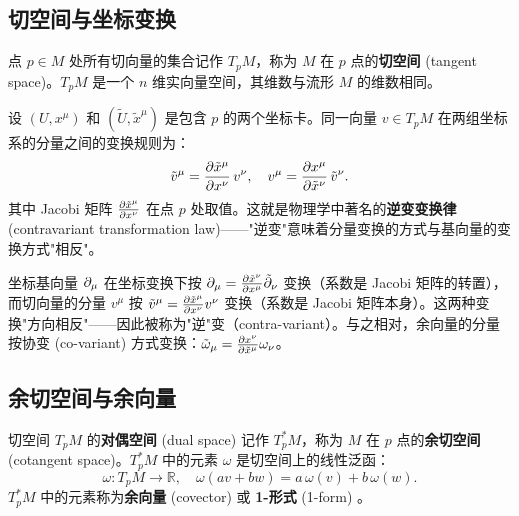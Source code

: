 \subsection{切空间与坐标变换}

\begin{definition}[切空间]
点 $p \in M$ 处所有切向量的集合记作 $T_pM$，称为 $M$ 在 $p$ 点的\textbf{切空间} (tangent space)。$T_pM$ 是一个 $n$ 维实向量空间，其维数与流形 $M$ 的维数相同。
\end{definition}

\begin{property}[切向量的坐标变换]
设 $(U, x^\mu)$ 和 $(\tilde{U}, \tilde{x}^\mu)$ 是包含 $p$ 的两个坐标卡。同一向量 $v \in T_pM$ 在两组坐标系的分量之间的变换规则为：
\begin{equation}
    \tilde{v}^\mu = \frac{\partial \tilde{x}^\mu}{\partial x^\nu} \, v^\nu, \quad v^\mu = \frac{\partial x^\mu}{\partial \tilde{x}^\nu} \, \tilde{v}^\nu.
\end{equation}
其中 Jacobi 矩阵 $\frac{\partial \tilde{x}^\mu}{\partial x^\nu}$ 在点 $p$ 处取值。这就是物理学中著名的\textbf{逆变变换律} (contravariant transformation law)——"逆变"意味着分量变换的方式与基向量的变换方式"相反"。
\end{property}

\begin{remark}[为什么称为"逆变"？]
坐标基向量 $\partial_\mu$ 在坐标变换下按 $\partial_\mu = \frac{\partial \tilde{x}^\nu}{\partial x^\mu} \tilde{\partial}_\nu$ 变换（系数是 Jacobi 矩阵的转置），而切向量的分量 $v^\mu$ 按 $\tilde{v}^\mu = \frac{\partial \tilde{x}^\mu}{\partial x^\nu} v^\nu$ 变换（系数是 Jacobi 矩阵本身）。这两种变换"方向相反"——因此被称为"逆"变（contra-variant）。与之相对，余向量的分量按协变 (co-variant) 方式变换：$\tilde{\omega}_\mu = \frac{\partial x^\nu}{\partial \tilde{x}^\mu} \omega_\nu$。
\end{remark}

\subsection{余切空间与余向量}

\begin{definition}[余切空间]
切空间 $T_pM$ 的\textbf{对偶空间} (dual space) 记作 $T_p^*M$，称为 $M$ 在 $p$ 点的\textbf{余切空间} (cotangent space)。$T_p^*M$ 中的元素 $\omega$ 是切空间上的线性泛函：
\begin{equation}
    \omega: T_pM \to \mathbb{R}, \quad \omega(av + bw) = a \, \omega(v) + b \, \omega(w).
\end{equation}
$T_p^*M$ 中的元素称为\textbf{余向量} (covector) 或 \textbf{1-形式} (1-form) \cite{Reall_Part3_GR}。
\end{definition}

